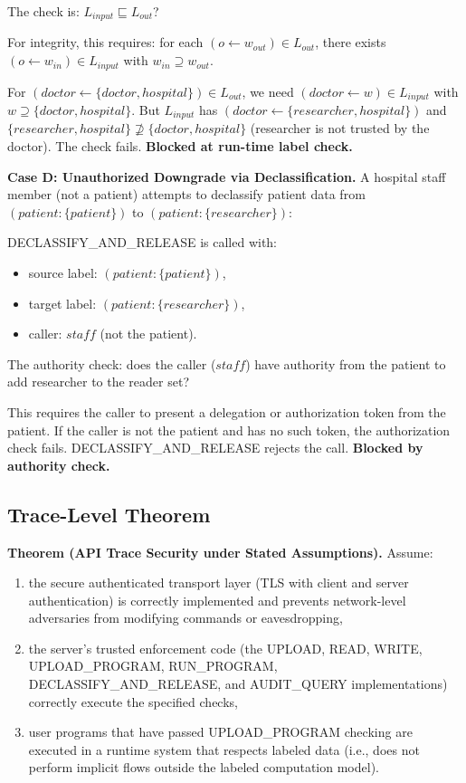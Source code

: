 The check is: $L_{input} \sqsubseteq L_{out}$?

For integrity, this requires: for each $(o \leftarrow w_{out}) \in L_{out}$, there exists $(o \leftarrow w_{in}) \in L_{input}$ with $w_{in} \supseteq w_{out}$.

For $(doctor \leftarrow \{doctor,hospital\}) \in L_{out}$, we need $(doctor \leftarrow w) \in L_{input}$ with $w \supseteq \{doctor,hospital\}$. But $L_{input}$ has $(doctor \leftarrow \{researcher,hospital\})$ and $\{researcher,hospital\} \not\supseteq \{doctor,hospital\}$ (researcher is not trusted by the doctor). The check fails. \textbf{Blocked at run-time label check.}

\textbf{Case D: Unauthorized Downgrade via Declassification.} A hospital staff member (not a patient) attempts to declassify patient data from $(patient:\{patient\})$ to $(patient:\{researcher\})$:

DECLASSIFY\_AND\_RELEASE is called with:
\begin{itemize}
    \item source label: $(patient:\{patient\})$,
    \item target label: $(patient:\{researcher\})$,
    \item caller: $staff$ (not the patient).
\end{itemize}

The authority check: does the caller ($staff$) have authority from the patient to add researcher to the reader set?

This requires the caller to present a delegation or authorization token from the patient. If the caller is not the patient and has no such token, the authorization check fails. DECLASSIFY\_AND\_RELEASE rejects the call. \textbf{Blocked by authority check.}

\subsection{Trace-Level Theorem}

\textbf{Theorem (API Trace Security under Stated Assumptions).}
Assume:
\begin{enumerate}
    \item the secure authenticated transport layer (TLS with client and server authentication) is correctly implemented and prevents network-level adversaries from modifying commands or eavesdropping,
    \item the server's trusted enforcement code (the UPLOAD, READ, WRITE, UPLOAD\_PROGRAM, RUN\_PROGRAM, DECLASSIFY\_AND\_RELEASE, and AUDIT\_QUERY implementations) correctly execute the specified checks,
    \item user programs that have passed UPLOAD\_PROGRAM checking are executed in a runtime system that respects labeled data (i.e., does not perform implicit flows outside the labeled computation model).
\end{enumerate}

